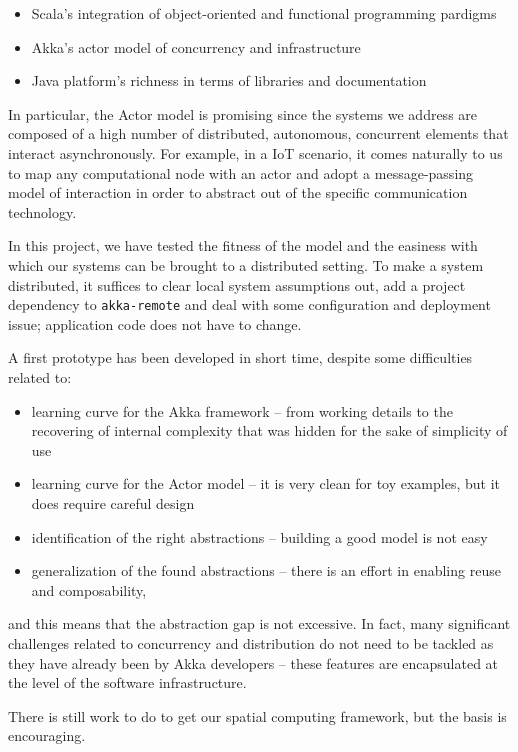 \documentclass[11pt]{llncs}
\begin{document}
\begin{itemize}
\item Scala's integration of object-oriented and functional programming pardigms
\item Akka's actor model of concurrency and infrastructure
\item Java platform's richness in terms of libraries and documentation
\end{itemize}

In particular, the Actor model is promising since the systems we address are composed of a high number of distributed, autonomous, concurrent elements that interact asynchronously. For example, in a IoT scenario, it comes naturally to us to map any computational node with an actor and adopt a message-passing model of interaction in order to abstract out of the specific communication technology.

In this project, we have tested the fitness of the model and the easiness with which our systems can be brought to a distributed setting. To make a system distributed, it suffices to clear local system assumptions out, add a project dependency to \texttt{akka-remote} and deal with some configuration and deployment issue; application code does not have to change.

A first prototype has been developed in short time, despite some 
  difficulties related to:
  
\begin{itemize}
\item learning curve for the Akka framework -- from working details to the recovering of internal complexity that was hidden for the sake of simplicity of use
\item learning curve for the Actor model -- it is very clean for toy examples, but it does require careful design
\item identification of the right abstractions -- building a good model is not easy
\item generalization of the found abstractions -- there is an effort in enabling reuse and composability,
\end{itemize}

and this means that the abstraction gap is not excessive. In fact, many significant challenges related to concurrency and distribution do not need to be tackled as they have already been by Akka developers -- these features are encapsulated at the level of the software infrastructure.

There is still work to do to get our spatial computing framework, but the basis is encouraging.
\end{document}
